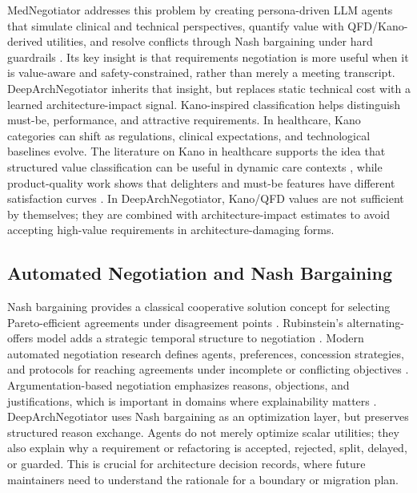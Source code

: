 \documentclass[english,preprint,nonatbib]{elsarticle}
\begin{document}
MedNegotiator addresses this problem by creating persona-driven LLM agents that simulate clinical and technical perspectives, quantify value with QFD/Kano-derived utilities, and resolve conflicts through Nash bargaining under hard guardrails \cite{tanhaei2026mednegotiator}.
Its key insight is that requirements negotiation is more useful when it is value-aware and safety-constrained, rather than merely a meeting transcript.
DeepArchNegotiator inherits that insight, but replaces static technical cost with a learned architecture-impact signal.
Kano-inspired classification helps distinguish must-be, performance, and attractive requirements. In healthcare, Kano categories can shift as regulations, clinical expectations, and technological baselines evolve.
The literature on Kano in healthcare supports the idea that structured value classification can be useful in dynamic care contexts \cite{materla2019kano}, while product-quality work shows that delighters and must-be features have different satisfaction curves \cite{matzler1996delight}.
In DeepArchNegotiator, Kano/QFD values are not sufficient by themselves; they are combined with architecture-impact estimates to avoid accepting high-value requirements in architecture-damaging forms.

\subsection{Automated Negotiation and Nash Bargaining}

Nash bargaining provides a classical cooperative solution concept for selecting Pareto-efficient agreements under disagreement points \cite{nash1950bargaining}.
Rubinstein's alternating-offers model adds a strategic temporal structure to negotiation \cite{rubinstein1982perfect}.
Modern automated negotiation research defines agents, preferences, concession strategies, and protocols for reaching agreements under incomplete or conflicting objectives \cite{fatima2014automated,faratin1998negotiation}.
Argumentation-based negotiation emphasizes reasons, objections, and justifications, which is important in domains where explainability matters \cite{rahwan2003argumentation,parsons1998arguing}.
DeepArchNegotiator uses Nash bargaining as an optimization layer, but preserves structured reason exchange. Agents do not merely optimize scalar utilities;
they also explain why a requirement or refactoring is accepted, rejected, split, delayed, or guarded.
This is crucial for architecture decision records, where future maintainers need to understand the rationale for a boundary or migration plan.
\end{document}
